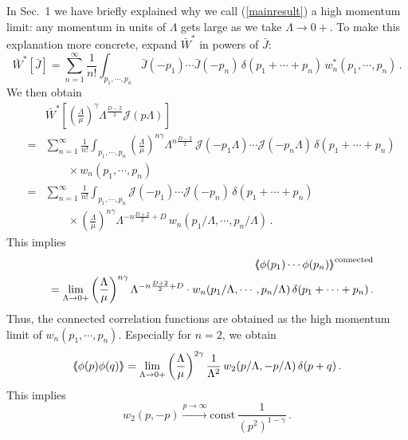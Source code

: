 \documentclass[aps,prd,preprint,groupedaddress,preprintnumbers,longbibliography]{revtex4-1}
\newcommand{\nn}{\nonumber}
\newcommand{\JJ}{\mathcal{J}}
\newcommand{\vev}[1]{\left\langle #1 \right\rangle}
\newcommand{\vvev}[1]{\vev{\kern-0.3em\left\langle #1
    \right\rangle\kern-0.3em}}
\begin{document}
In Sec.~1 we have briefly explained why we call (\ref{mainresult}) a
high momentum limit: any momentum in units of $\Lambda$ gets large as
we take $\Lambda \to 0+$.  To make this explanation more concrete,
expand $\bar{W}^*$ in powers of $\bar{J}$:
\begin{equation}
\bar{W}^*  [\bar{J}] = \sum_{n=1}^\infty \frac{1}{n!} \int_{p_1, \cdots,
  p_{n}} \bar{J}(-p_1) \cdots \bar{J}(-p_{n})\,\delta (p_1 + \cdots + p_{n})\,
w^*_{n} (p_1, \cdots, p_{n})\,.
\end{equation}
We then obtain
\begin{eqnarray}
&&  \bar{W}^* \left[ \left(\frac{\Lambda}{\mu}\right)^\gamma
  \Lambda^{\frac{D-2}{2}} \JJ (p\Lambda) \right] \nn\\
&=& \sum_{n=1}^\infty \frac{1}{n!} \int_{p_1, \cdots,
    p_{n}} \left(\frac{\Lambda}{\mu}\right)^{n \gamma}
\Lambda^{n \frac{D-2}{2}} \, \JJ (-p_1 \Lambda) \cdots \JJ (-p_n \Lambda)
\,\delta (p_1 + \cdots + p_{n})\nn\\
  &&\qquad \times w_{n} (p_1, \cdots, p_{n})\nn\\
  &=&\sum_{n=1}^\infty \frac{1}{n!} \int_{p_1, \cdots, p_{n}}
  \JJ (-p_1) \cdots \JJ (-p_{n}) \,\delta (p_1 + \cdots + p_{n})\nn\\
  &&\qquad \times  \left(\frac{\Lambda}{\mu}\right)^{n \gamma}
\Lambda^{-n \frac{D+2}{2}+D} \, w_{n} (p_1/\Lambda, \cdots, p_{n}/\Lambda)\,.
\end{eqnarray}
This implies
\begin{eqnarray}
&&\vvev{\phi (p_1) \cdots \phi (p_{n})}^{\mathrm{connected}}\nn\\
&&= \lim_{\Lambda \to 0+}
 \left(\frac{\Lambda}{\mu}\right)^{n \gamma}
\Lambda^{-n \frac{D+2}{2}+D} \cdot w_{n} (p_1/\Lambda, \cdots,
   p_{n}/\Lambda)
\, \delta (p_1 + \cdots + p_{n})\,.
\end{eqnarray}
Thus, the connected correlation functions are obtained as the high
momentum limit of $w_{n} (p_1, \cdots, p_{n})$.
Especially for $n=2$, we obtain
\begin{equation}
\vvev{\phi (p) \phi (q)} = \lim_{\Lambda \to 0+}
\left(\frac{\Lambda}{\mu}\right)^{2 \gamma} \frac{1}{\Lambda^2}\, w_2
(p/\Lambda, -p/\Lambda) \,\delta (p+q)\,.
\end{equation}
This implies
\begin{equation}
w_2 (p , - p ) \stackrel{p \to \infty}{\longrightarrow}
\textrm{const} \, \frac{1}{(p^2)^{1 - \gamma}}\,. 
\end{equation}
\end{document}
